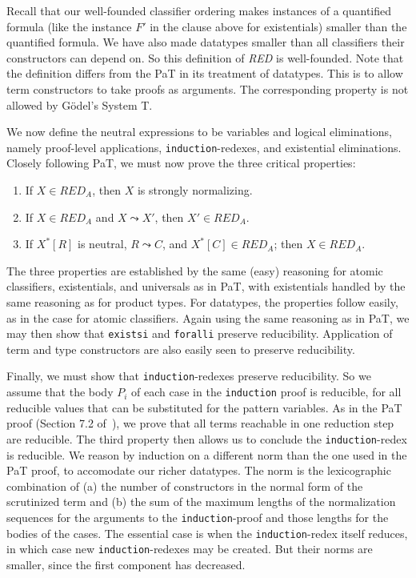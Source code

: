 \documentclass{fundam}
\begin{document}
\noindent Recall that our well-founded classifier ordering makes
instances of a quantified formula (like the instance $F'$ in the
clause above for existentials) smaller than the quantified formula.
We have also made datatypes smaller than all classifiers their
constructors can depend on.  So this definition of \textit{RED} is
well-founded.  Note that the definition differs from the PaT in its
treatment of datatypes.  This is to allow term constructors to take
proofs as arguments.  The corresponding property is not allowed by
G\"odel's System T.

We now define the neutral expressions to be variables and logical
eliminations, namely proof-level applications,
\texttt{induction}-redexes, and existential eliminations.  Closely
following PaT, we must now prove the three critical properties:

\begin{enumerate}
\item If $X\in\textit{RED}_A$, then $X$ is strongly normalizing.
\item If $X\in\textit{RED}_A$ and $X \leadsto X'$, then
$X'\in\textit{RED}_A$.
\item If $X^*[R]$ is neutral, $R \leadsto C$, and
$X^*[C]\in\textit{RED}_A$; then $X\in\textit{RED}_A$.
\end{enumerate}

\noindent The three properties are established by the same (easy)
reasoning for atomic classifiers, existentials, and universals as in
PaT, with existentials handled by the same reasoning as for product
types.  For datatypes, the properties follow easily, as in the case
for atomic classifiers.  Again using the same reasoning as in PaT, we
may then show that \texttt{existsi} and \texttt{foralli} preserve
reducibility.  Application of term and type constructors are also
easily seen to preserve reducibility.  

Finally, we must show that \texttt{induction}-redexes preserve
reducibility.  So we assume that the body $P_i$ of each case in the
\texttt{induction} proof is reducible, for all reducible values that
can be substituted for the pattern variables.  As in the PaT proof
(Section 7.2 of~\cite{pat}), we prove that all terms reachable in one
reduction step are reducible.  The third property then allows us to
conclude the \texttt{induction}-redex is reducible.  We reason by
induction on a different norm than the one used in the PaT proof, to
accomodate our richer datatypes.  The norm is the lexicographic
combination of (a) the number of constructors in the normal form of
the scrutinized term and (b) the sum of the maximum lengths of the
normalization sequences for the arguments to the
\texttt{induction}-proof and those lengths for the bodies of the
cases.  The essential case is when the \texttt{induction}-redex itself
reduces, in which case new \texttt{induction}-redexes may be created.
But their norms are smaller, since the first component has decreased.
\end{document}
